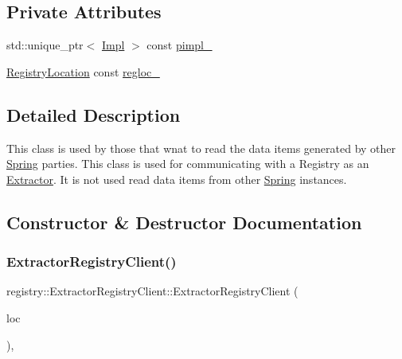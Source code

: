 \subsection*{Private Attributes}
\begin{DoxyCompactItemize}
\item 
std\+::unique\+\_\+ptr$<$ \hyperlink{classregistry_1_1ExtractorRegistryClient_1_1Impl}{Impl} $>$ const \hyperlink{classregistry_1_1ExtractorRegistryClient_a7317fd7b55decd9a8f8c9db522db9b15}{pimpl\+\_\+}
\item 
\hyperlink{structregistry_1_1RegistryLocation}{Registry\+Location} const \hyperlink{classregistry_1_1ExtractorRegistryClient_a1092af361441aac2f5d84ae79267f4b7}{regloc\+\_\+}
\end{DoxyCompactItemize}


\subsection{Detailed Description}
This class is used by those that wnat to read the data items generated by other \hyperlink{classSpring}{Spring} parties. This class is used for communicating with a Registry as an \hyperlink{classExtractor}{Extractor}. It is not used read data items from other \hyperlink{classSpring}{Spring} instances. 

\subsection{Constructor \& Destructor Documentation}
\mbox{\label{classregistry_1_1ExtractorRegistryClient_a79e68c10ba8b6721529bf0b1f713f247}} 
\subsubsection{\texorpdfstring{Extractor\+Registry\+Client()}{ExtractorRegistryClient()}\hspace{0.1cm}{\footnotesize\ttfamily [1/3]}}
{\footnotesize\ttfamily registry\+::\+Extractor\+Registry\+Client\+::\+Extractor\+Registry\+Client (\begin{DoxyParamCaption}\item[{\hyperlink{structregistry_1_1RegistryLocation}{Registry\+Location} const \&}]{loc }\end{DoxyParamCaption})\hspace{0.3cm}{\ttfamily [explicit]}, {\ttfamily [noexcept]}}

